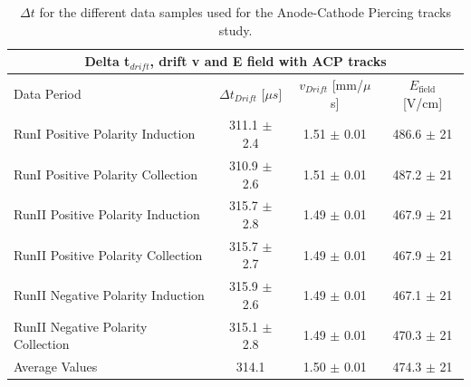 \begin{center}
\begin{table}[htb]
  \begin{center}
    \begin{tabular}{|l|c|c|c|}
      \multicolumn{4}{c}{\textbf{Delta t$_{drift}$, drift v and E field with ACP tracks}} \\
      \hline \hline
       Data Period  & $\Delta t_{Drift}$ [$\mu s$] & $v_{Drift}$ [mm/$\mu$s] & $E_{\text{field}}$ [V/cm] \\
       \hline
       RunI Positive Polarity Induction &  311.1 $\pm$ 2.4   &1.51 $\pm$ 0.01  & 486.6 $\pm$ 21\\
       \hline
       RunI Positive Polarity Collection &  310.9 $\pm$ 2.6 & 1.51 $\pm$ 0.01  &  487.2 $\pm$ 21\\
       \hline
       RunII Positive Polarity Induction &   315.7 $\pm$ 2.8 & 1.49 $\pm$ 0.01 &  467.9 $\pm$ 21\\
       \hline
       RunII Positive Polarity Collection &  315.7 $\pm$ 2.7 & 1.49 $\pm$ 0.01 &  467.9 $\pm$ 21\\
       \hline
       RunII Negative Polarity Induction &   315.9 $\pm$ 2.6 & 1.49 $\pm$ 0.01  & 467.1 $\pm$ 21 \\
       \hline
       RunII Negative Polarity Collection &  315.1 $\pm$ 2.8 & 1.49 $\pm$ 0.01  & 470.3 $\pm$ 21  \\
       \hline
       \hline
       Average Values & 314.1 & 1.50 $\pm$ 0.01 & 474.3 $\pm$ 21 \\
       \hline
       \end{tabular}
    \caption{$\Delta t$ for the different data samples used for the Anode-Cathode Piercing tracks study. }
    \label{tab:deltaTACP}
    \end{center}
\end{table}
\end{center}




